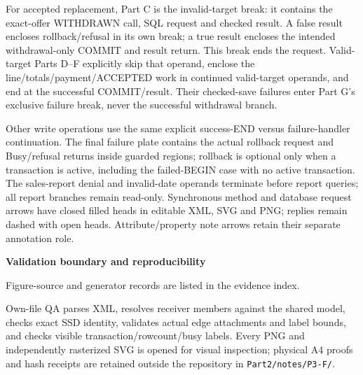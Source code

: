 For accepted replacement, Part C is the invalid-target break: it contains the exact-offer WITHDRAWN call, SQL request and checked result. A false result encloses rollback/refusal in its own break; a true result encloses the intended withdrawal-only COMMIT and result return. This break ends the request. Valid-target Parts D--F explicitly skip that operand, enclose the line/totals/payment/ACCEPTED work in continued valid-target operands, and end at the successful COMMIT/result. Their checked-save failures enter Part G's exclusive failure break, never the successful withdrawal branch.

Other write operations use the same explicit success-END versus failure-handler continuation. The final failure plate contains the actual rollback request and Busy/refusal returns inside guarded regions; rollback is optional only when a transaction is active, including the failed-BEGIN case with no active transaction. The sales-report denial and invalid-date operands terminate before report queries; all report branches remain read-only. Synchronous method and database request arrows have closed filled heads in editable XML, SVG and PNG; replies remain dashed with open heads. Attribute/property note arrows retain their separate annotation role.

\textbf{Validation boundary and reproducibility}

Figure-source and generator records are listed in the evidence index.

Own-file QA parses XML, resolves receiver members against the shared model, checks exact SSD identity, validates actual edge attachments and label bounds, and checks visible transaction/rowcount/busy labels. Every PNG and independently rasterized SVG is opened for visual inspection; physical A4 proofs and hash receipts are retained outside the repository in \texttt{Part2/\allowbreak{}notes/\allowbreak{}P3-F/\allowbreak{}}.
